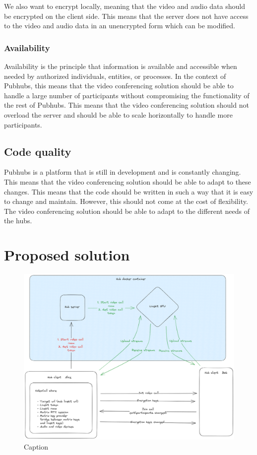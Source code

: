\documentclass{report}
\begin{document}
We also want to encrypt locally, meaning that the video and audio data should be encrypted on the client side. This
means that the server does not have access to the video and audio data in an unencrypted form which can be modified.

\subsection{Availability}
Availability is the principle that information is available and accessible when needed by authorized individuals,
entities, or processes. In the context of Pubhubs, this means that the video conferencing solution should be able to
handle a large number of participants without compromising the functionality of the rest of Pubhubs. This means that
the video conferencing solution should not overload the server and should be able to scale horizontally to handle
more participants.


\section{Code quality}
Pubhubs is a platform that is still in development and is constantly changing. This means that the video
conferencing solution should be able to adapt to these changes. This means that the code should be written in such a way that it
is easy to change and maintain. However, this should not come at the cost of flexibility. The video conferencing
solution should be able to adapt to the different needs of the hubs.




\chapter{Proposed solution}

\begin{figure}
\centering
\includegraphics[width=\textwidth]{img/PH_videocall.excalidraw.png}
\caption{Caption}
\label{fig:video-conference-setup}
\end{figure}
\end{document}
